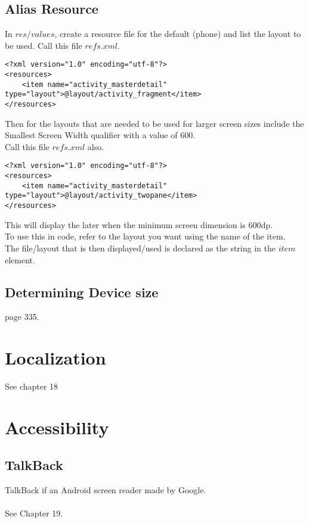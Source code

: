 \documentclass[]{article}
\begin{document}
\subsection{Alias Resource}
In $res/values$, create a resource file for the default (phone) and list the layout to be used.  Call this file $refs.xml$.
\begin{lstlisting}
<?xml version="1.0" encoding="utf-8"?>
<resources>
	<item name="activity_masterdetail" type="layout">@layout/activity_fragment</item>
</resources>
\end{lstlisting}
Then for the layouts that are needed to be used for larger screen sizes include the Smallest Screen Width qualifier with a value of 600.
\\
Call this file $refs.xml$ also.
\begin{lstlisting}
<?xml version="1.0" encoding="utf-8"?>
<resources>
	<item name="activity_masterdetail" type="layout">@layout/activity_twopane</item>
</resources>
\end{lstlisting}
This will display the later when the minimum screen dimension is 600dp.
\\
To use this in code, refer to the layout you want using the name of the item.
\\
The file/layout that is then displayed/used is declared as the string in the $item$ element.

\subsection{Determining Device size}
page 335.

\section{Localization}
See chapter 18

\section{Accessibility}
\subsection{TalkBack}
TalkBack if an Android screen reader made by Google.
\\\\
See Chapter 19.

\end{document}
